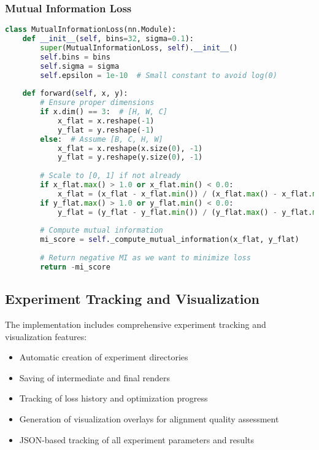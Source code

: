 \subsubsection{Mutual Information Loss}
\begin{lstlisting}[language=Python]
class MutualInformationLoss(nn.Module):
    def __init__(self, bins=32, sigma=0.1):
        super(MutualInformationLoss, self).__init__()
        self.bins = bins
        self.sigma = sigma
        self.epsilon = 1e-10  # Small constant to avoid log(0)
        
    def forward(self, x, y):
        # Ensure proper dimensions
        if x.dim() == 3:  # [H, W, C]
            x_flat = x.reshape(-1)
            y_flat = y.reshape(-1)
        else:  # Assume [B, C, H, W]
            x_flat = x.reshape(x.size(0), -1)
            y_flat = y.reshape(y.size(0), -1)
            
        # Scale to [0, 1] if not already
        if x_flat.max() > 1.0 or x_flat.min() < 0.0:
            x_flat = (x_flat - x_flat.min()) / (x_flat.max() - x_flat.min() + self.epsilon)
        if y_flat.max() > 1.0 or y_flat.min() < 0.0:
            y_flat = (y_flat - y_flat.min()) / (y_flat.max() - y_flat.min() + self.epsilon)
            
        # Compute mutual information
        mi_score = self._compute_mutual_information(x_flat, y_flat)
        
        # Return negative MI as we want to minimize loss
        return -mi_score
\end{lstlisting}

\subsection{Experiment Tracking and Visualization}

The implementation includes comprehensive experiment tracking and visualization features:

\begin{itemize}
    \item Automatic creation of experiment directories
    \item Saving of intermediate and final renders
    \item Tracking of loss history and optimization progress
    \item Generation of visualization overlays for alignment quality assessment
    \item JSON-based tracking of all experiment parameters and results
\end{itemize}

